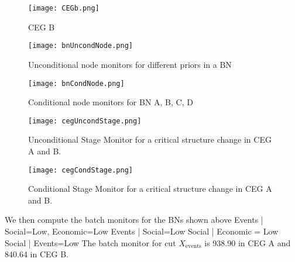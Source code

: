 \documentclass[12pt]{article}
\begin{document}
\begin{figure}
	\texttt{[image: CEGb.png]}
	\caption{CEG B}
\end{figure}

\begin{figure}
	\texttt{[image: bnUncondNode.png]}
	\caption{Unconditional node monitors for different priors in a BN}
\end{figure}

\begin{figure}
	\texttt{[image: bnCondNode.png]}
	\caption{Conditional node monitors for BN A, B, C, D}
\end{figure}

\begin{figure}
	\texttt{[image: cegUncondStage.png]}
	\caption{Unconditional Stage Monitor for a critical structure change in CEG A and B.}
\end{figure}


\begin{figure}
	\texttt{[image: cegCondStage.png]}
	\caption{Conditional Stage Monitor for a critical structure change in CEG A and B.}
\end{figure}

We then compute the batch monitors for the BNs shown above 
Events | Social=Low, Economic=Low
Events | Social=Low
Social | Economic = Low
Social | Events=Low
The batch monitor for cut $X_{\text{events}}$ is 938.90 in CEG A and 840.64 in CEG B. 



%
%
%	
%	
%
%
%
%
% 
%    
%
\end{document}
